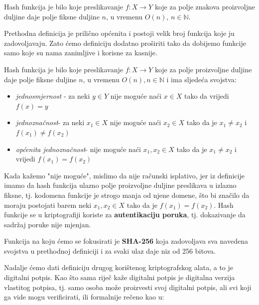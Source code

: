 \documentclass[a4paper,oneside,12pt]{memoir} %
\begin{document}
\begin{definicija} 
Hash funkcija je bilo koje preslikavanje $f\colon X \to Y$ koje za polje znakova proizvoljne duljine daje polje fiksne duljine $n$, u vremenu $O(n)$, $n \in \mathbb{N}$. 
\end{definicija}

Prethodna definicija je prilično općenita i postoji velik broj funkcija koje ju zadovoljavaju. Zato ćemo definiciju dodatno proširiti tako da dobijemo funkcije samo koje su nama zanimljive i korisne za kasnije.

\begin{definicija}
Hash funkcija je bilo koje preslikavanje $f\colon X \to Y$ koje za polje proizvoljne duljine daje polje fiksne duljine $n$, u vremenu $O(n), n \in \mathbb{N}$ i ima sljedeća svojstva:
\begin{itemize}
    \item \textit{jednosmjernost} - za neki $y \in Y$ nije moguće naći $x \in X$ tako da vrijedi $f(x)=y$
    \item \textit{jednoznačnost}- za neki $x_{1} \in X$ nije moguće naći $x_{2} \in X$ tako da je $x_{1}\not=x_{2}$ i $f(x_{1}) \not= f(x_{2})$
    \item \textit{općenita jednoznačnost}- nije moguće naći $x_{1}, x_{2} \in X$ tako da je $x_{1} \not= x_{2}$ i vrijedi $f(x_{1}) = f(x_{2})$
\end{itemize}
\end{definicija}

Kada kažemo "nije moguće", mislimo da nije računski isplativo, jer iz definicije imamo da hash funkcija ulazno polje proizvoljne duljine preslikava u izlazno fiksne, tj. kodomena funkcije je strogo manja od njene domene, što bi značilo da moraju postojati barem neki $x_{1}, x_{2} \in X$ tako da je $f(x_{1}) = f(x_{2})$. Hash funkcije se u kriptografiji koriste za \textbf{autentikaciju poruka}, tj. dokazivanje da sadržaj poruke nije mjenjan. 

Funkcija na koju ćemo se fokusirati je \textbf{SHA-256} koja zadovoljava sva navedena svojstva u prethodnoj definiciji i za svaki ulaz daje niz od 256 bitova.

Nadalje ćemo dati definiciju drugog korištenog kriptografskog alata, a to je digitalni potpis. Kao što sama riječ kaže digitalni potpis je digitalna verzija vlastitog potpisa, tj. samo osoba može proizvesti svoj digitalni potpis, ali svi koji ga vide mogu verificirati, ili formalnije rečeno kao u\cite{bitcoincrypto}:
\end{document}
